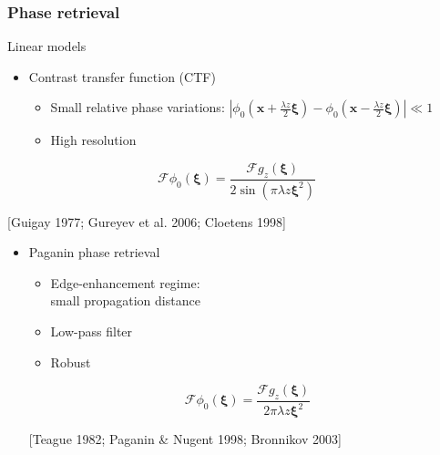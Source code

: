 \documentclass{beamer}
\renewcommand{\vec}{\mathbold}
\newcommand{\vecx}{\vec{x}}
\newcommand{\vecxi}{\vec{\xi}}
\newcommand{\abs}[1]{\left| #1 \right|} %
\newcommand{\F}{\mathcal{F}}
\newcommand{\srefr}[1]{\begin{flushright}{\tiny [#1]}\end{flushright}}
\begin{document}
\begin{frame}
  \frametitle{Phase retrieval}
  Linear models
  \vfill
  \begin{itemize}
  \item Contrast transfer function (CTF)
    \begin{itemize}
    \item Small relative phase variations:
      $\abs{\phi_0(\vecx+\tfrac{\lambda z}{2}\vecxi)
        -\phi_0(\vecx-\tfrac{\lambda z}{2}\vecxi)}\ll 1$
    \item High resolution
    \end{itemize}
  \end{itemize}

  \begin{equation*}
    \F\phi_0(\vecxi) = \frac{\F g_z(\vecxi) }{2\sin(\pi\lambda z\vecxi^2)}
  \end{equation*}
  \srefr{Guigay 1977; Gureyev et al. 2006; Cloetens 1998}
  \vfill
  \begin{itemize}
  \item Paganin phase retrieval
    \begin{itemize}
    \item Edge-enhancement regime: \\small propagation distance
    \item Low-pass filter
    \item Robust
    \end{itemize}
    \begin{equation*}
      \F\phi_0(\vecxi) = \frac{\F g_z(\vecxi) }{2\pi\lambda z\vecxi^2}
    \end{equation*}
    \srefr{Teague 1982; Paganin \& Nugent 1998; Bronnikov 2003}
  \end{itemize}
\end{frame}
\end{document}
